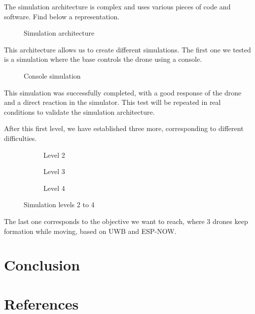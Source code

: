 \documentclass[conference]{IEEEtran}
\begin{document}
The simulation architecture is complex and uses various pieces of code and
software. Find below a representation.

\begin{figure}[H]
    \centering
    \resizebox{\linewidth}{!}{\SchSimulation}
    \caption{Simulation architecture}
    \label{fig:SchSimulation}
\end{figure}

This architecture allows us to create different simulations. The first one we
tested is a simulation where the base controls the drone using a console.

\begin{figure}[H]
    \centering
    \resizebox{\linewidth}{!}{\LevelUN}
    \caption{Console simulation}
    \label{fig:LevelUN}
\end{figure}

This simulation was successfully completed, with a good response of the drone
and a direct reaction in the simulator. This test will be repeated in real
conditions to validate the simulation architecture.

After this first level, we have established three more, corresponding to
different difficulties.

\begin{figure}[H]
    \centering
    \begin{subfigure}{0.48\linewidth}
        \centering
        \resizebox{\linewidth}{!}{\LevelDeux}
        \caption{Level 2}
        \label{fig:LevelDeux}
    \end{subfigure}\hfill
    \begin{subfigure}{0.48\linewidth}
        \centering
        \resizebox{\linewidth}{!}{\LevelTrois}
        \caption{Level 3}
        \label{fig:LevelTrois}
    \end{subfigure}

    \vspace{1em}

    \begin{subfigure}{0.7\linewidth}
        \centering
        \resizebox{\linewidth}{!}{\LevelQuatre}
        \caption{Level 4}
        \label{fig:LevelQuatre}
    \end{subfigure}

    \caption{Simulation levels 2 to 4}
    \label{fig:Levels}
\end{figure}

The last one corresponds to the objective we want to reach, where 3 drones keep
formation while moving, based on UWB and ESP-NOW.   

\section{Conclusion}

\section*{References}
\end{document}
